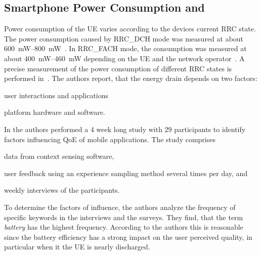 \subsection{Smartphone Power Consumption and }\label{sec:network:background:energy_consumption_qoe}

Power consumption of the \gls{UE} varies according to the devices current \gls{RRC} state.
The power consumption caused by \gls{RRC_DCH} mode was measured at about \SIrange{600}{800}{\milli\watt}~\cite{Qian2011,Qian2010a}.
In \gls{RRC_FACH} mode, the consumption was measured at about \SIrange{400}{460}{\milli\watt} depending on the \gls{UE} and the network operator~\cite{Qian2010a}.
A precise measurement of the power consumption of different \gls{RRC} states is performed in~\cite{Qian2010a,Balasubramanian2009,Lee2004}. 
The authors report, that the energy drain depends on two factors: 
\begin{enumerate*}
\item user interactions and applications 
\item platform hardware and software.
\end{enumerate*}

In \cite{Ickin2012} the authors performed a 4 week long study with 29 participants to identify factors influencing \gls{QoE} of mobile applications.
The study comprises
\begin{enumerate*}
\item data from context sensing software,
\item user feedback using an experience sampling method several times per day, and
\item weekly interviews of the participants.
\end{enumerate*}
To determine the factors of influence, the authors analyze the frequency of specific keywords in the interviews and the surveys.
They find, that the term \emph{battery} has the highest frequency.
According to the authors this is reasonable since the battery efficiency has a strong impact on the user perceived quality, in particular when it the \gls{UE} is nearly discharged.